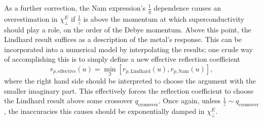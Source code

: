 \documentclass[%
 preprint,
 amsmath,amssymb,
 aps,
]{revtex4-2}
\begin{document}
As a further correction, the Nam expression's $\frac{1}{q}$ dependence causes an overestimation in $\chi_\perp^E$ if $\frac{1}{z}$ is above the momentum at which superconductivity should play a role, on the order of the Debye momentum.
Above this point, the Lindhard result suffices as a description of the metal's response.
This can be incorporated into a numerical model by interpolating the results;
one crude way of accomplishing this is to simply define a new effective reflection coefficient
\begin{equation}
	r_{p, \mathrm{effective}}(u) = \min_{\Im}\left[r_{p, \mathrm{Lindhard}}\left(u\right), r_{p, \mathrm{Nam}}\left(u\right)\right],
\end{equation}
where the right hand side should be interpreted to choose the argument with the smaller imaginary part.
This effectively forces the reflection coefficient to choose the Lindhard result above some crossover $q_{\mathrm{crossover}}$.
Once again, unless $\frac{1}{z} \sim q_{\mathrm{crossover}}$, the inaccuracies this causes should be exponentially damped in $\chi_\perp^E$.
\end{document}
